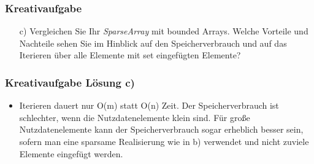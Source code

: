 \begin{frame}
	\frametitle{Kreativaufgabe}

	\begin{itemize}
		\item[c)] Vergleichen Sie Ihr \textit{SparseArray} mit bounded Arrays. Welche Vorteile und Nachteile sehen
			Sie im Hinblick auf den Speicherverbrauch und auf das Iterieren über alle Elemente mit set eingefügten Elemente?
	\end{itemize}

\end{frame}

\begin{frame}
	\frametitle{Kreativaufgabe Lösung c)}
	\begin{itemize}
		\item Iterieren dauert nur O(m) statt O(n) Zeit. Der Speicherverbrauch ist schlechter, wenn die
			Nutzdatenelemente klein sind. Für große Nutzdatenelemente kann der Speicherverbrauch sogar erheblich besser sein,
			sofern man eine sparsame Realisierung wie in b) verwendet und nicht zuviele Elemente eingefügt werden.
	\end{itemize}
\end{frame}


